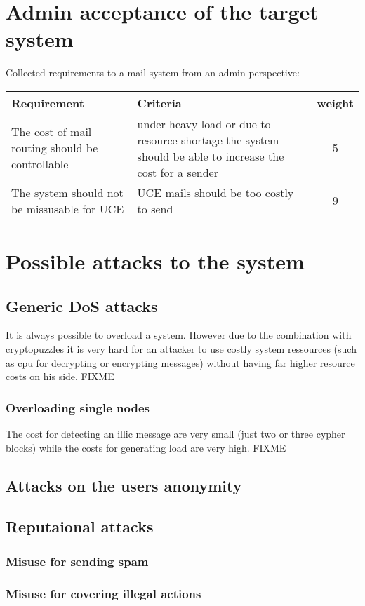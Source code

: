 \section{Admin acceptance of the target system}
Collected requirements to a mail system from an admin perspective:\par
\begin{tabular}{|p{5cm}|p{5cm}|c|}\hline
Requirement& Criteria& weight\\\hline
The cost of mail routing should be controllable & under heavy load or due to resource shortage the system should be able to increase the cost for a sender & 5\\
The system should not be missusable for UCE & UCE mails should be too costly to send & 9\\
\hline\end{tabular}
\section{Possible attacks to the system}
\subsection{Generic DoS attacks}
It is always possible to overload a system. However due to the combination with cryptopuzzles it is very hard for an attacker to use costly system ressources (such as cpu for decrypting or encrypting messages) without having far higher resource costs on his side. FIXME
\subsubsection{Overloading single nodes}
The cost for detecting an illic message are very small (just two or three cypher blocks) while the costs for generating load are very high. FIXME
\subsection{Attacks on the users anonymity}
\subsection{Reputaional attacks}
\subsubsection{Misuse for sending spam}
\subsubsection{Misuse for covering illegal actions}


